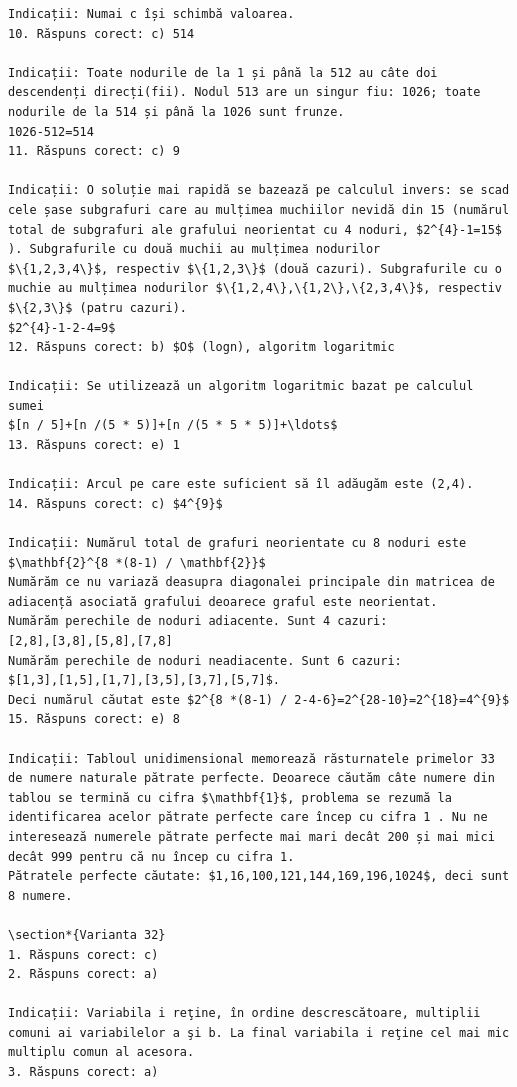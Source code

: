 \documentclass[10pt]{article}
\begin{document}
\begin{verbatim}
Indicații: Numai c își schimbă valoarea.
10. Răspuns corect: c) 514

Indicații: Toate nodurile de la 1 și până la 512 au câte doi descendenți direcți(fii). Nodul 513 are un singur fiu: 1026; toate nodurile de la 514 și până la 1026 sunt frunze.
1026-512=514
11. Răspuns corect: c) 9

Indicații: O soluție mai rapidă se bazează pe calculul invers: se scad cele șase subgrafuri care au mulțimea muchiilor nevidă din 15 (numărul total de subgrafuri ale grafului neorientat cu 4 noduri, $2^{4}-1=15$ ). Subgrafurile cu două muchii au mulțimea nodurilor
$\{1,2,3,4\}$, respectiv $\{1,2,3\}$ (două cazuri). Subgrafurile cu o muchie au mulțimea nodurilor $\{1,2,4\},\{1,2\},\{2,3,4\}$, respectiv $\{2,3\}$ (patru cazuri).
$2^{4}-1-2-4=9$
12. Răspuns corect: b) $O$ (logn), algoritm logaritmic

Indicații: Se utilizează un algoritm logaritmic bazat pe calculul sumei
$[n / 5]+[n /(5 * 5)]+[n /(5 * 5 * 5)]+\ldots$
13. Răspuns corect: e) 1

Indicații: Arcul pe care este suficient să îl adăugăm este (2,4).
14. Răspuns corect: c) $4^{9}$

Indicații: Numărul total de grafuri neorientate cu 8 noduri este $\mathbf{2}^{8 *(8-1) / \mathbf{2}}$
Numărăm ce nu variază deasupra diagonalei principale din matricea de adiacență asociată grafului deoarece graful este neorientat.
Numărăm perechile de noduri adiacente. Sunt 4 cazuri:
[2,8],[3,8],[5,8],[7,8]
Numărăm perechile de noduri neadiacente. Sunt 6 cazuri:
$[1,3],[1,5],[1,7],[3,5],[3,7],[5,7]$.
Deci numărul căutat este $2^{8 *(8-1) / 2-4-6}=2^{28-10}=2^{18}=4^{9}$
15. Răspuns corect: e) 8

Indicații: Tabloul unidimensional memorează răsturnatele primelor 33 de numere naturale pătrate perfecte. Deoarece căutăm câte numere din tablou se termină cu cifra $\mathbf{1}$, problema se rezumă la identificarea acelor pătrate perfecte care încep cu cifra 1 . Nu ne interesează numerele pătrate perfecte mai mari decât 200 și mai mici decât 999 pentru că nu încep cu cifra 1.
Pătratele perfecte căutate: $1,16,100,121,144,169,196,1024$, deci sunt 8 numere.

\section*{Varianta 32}
1. Răspuns corect: c)
2. Răspuns corect: a)

Indicații: Variabila i reţine, în ordine descrescătoare, multiplii comuni ai variabilelor a şi b. La final variabila i reţine cel mai mic multiplu comun al acesora.
3. Răspuns corect: a)


\end{verbatim}
\end{document}
